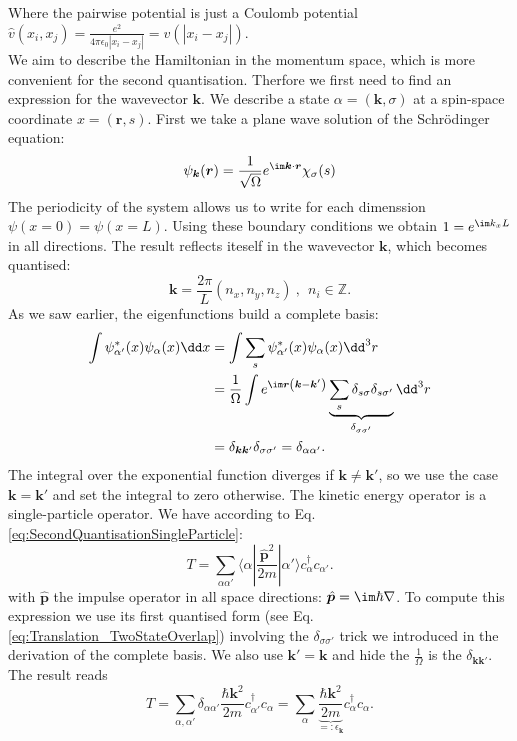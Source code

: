 \documentclass[../main.tex]{subfile}
\begin{document}
Where the pairwise potential is just a Coulomb potential $\hat{v}(x_i, x_j) = \frac{e^2}{4\pi\epsilon_0|x_i - x_j|} = v(|x_i - x_j|)$.\\
We aim to describe the Hamiltonian in the momentum space, which is more convenient for the second quantisation. Therfore we first
need to find an expression for the wavevector $\bm{k}$. We describe a state $\alpha = (\bm{k}, \sigma)$ at a spin-space coordinate $x = (\bm{r}, s)$.
 First we take a plane wave solution of the Schrödinger equation:
\[
    \psi_{\bm{k}}(\bm{r}) = \frac{1}{\sqrt{\Omega}} e^{\im \bm{k}\cdot\bm{r}} \chi_\sigma(s)
\]
The periodicity of the system allows us to write for each dimenssion $\psi(x=0) = \psi(x=L)$. Using these boundary conditions we obtain 
$1= e^{\im k_x L}$ in all directions. The result reflects iteself in the wavevector $\bm{k}$, which becomes quantised:
\[
    \bm{k} = \frac{2\pi}{L}(n_x, n_y, n_z)~,~~n_i\in \mathbb{Z}.
\]
As we saw earlier, the eigenfunctions build a complete basis:
\begin{align*}
    \int \psi^{\ast}_{\alpha'}(x) \psi_{\alpha}(x) \dd x &= \int \sum_{s} \psi^{\ast}_{\alpha'}(x) \psi_{\alpha}(x) \dd^3r \\
    &=\frac{1}{\Omega} \int e^{\im\bm{r}\left(\bm{k}- \bm{k}'\right)} \underbrace{\sum_s \delta_{s\sigma}\delta_{s\sigma'}}_{\delta_{\sigma\sigma'}} \dd^3 r\\
    &= \delta_{\bm{k}\bm{k}'}\delta_{\sigma\sigma'} = \delta_{\alpha\alpha'}.
\end{align*}    
The integral over the exponential function diverges if $\bm{k} \neq \bm{k}'$, so we use the case $\bm{k} = \bm{k}'$ and set the integral to zero otherwise.
The kinetic energy operator is a single-particle operator. We have according to Eq.\ref{eq:SecondQuantisationSingleParticle}:
\[
    T = \sum_{\alpha\alpha'} \langle \alpha|\frac{\hat{\bm{p}}^2}{2m}|\alpha'\rangle c_{\alpha}^{\dagger}c_{\alpha'}.
\]
with $\hat{\bm{p}}$ the impulse operator in all space directions: $\hat{\bm{p}} = \im \hbar \nabla$. To compute this expression we use its 
first quantised form (see Eq.\ref{eq:Translation_TwoStateOverlap}) involving the $\delta_{\sigma\sigma'}$ trick we introduced
in the derivation of the complete basis. We also use  $\bm{k}' = \bm{k}$ and hide the $\frac{1}{\Omega}$ is the $\delta_{\bm{k}\bm{k}'}$. The result reads
\begin{equation}\label{eq:interactingGasT}
    T = \sum_{\alpha,\alpha'} \delta_{\alpha\alpha'} \frac{\hbar \bm{k}^2}{2m} c_{\alpha'}^{\dagger} c_{\alpha} 
    = \sum_{\alpha} \underbrace{\frac{\hbar \bm{k}^2}{2m}}_{=:\epsilon_{\bm{k}}} c_{\alpha}^{\dagger} c_{\alpha}.
\end{equation}
\end{document}
